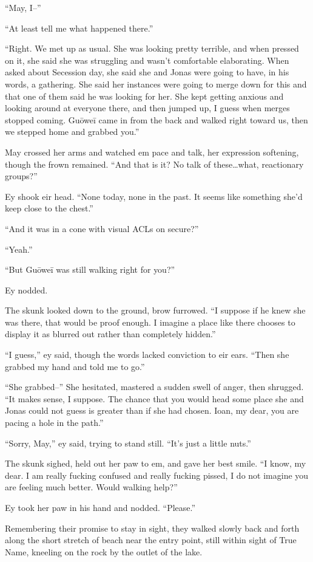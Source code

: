 ``May, I--''

``At least tell me what happened there.''

``Right. We met up as usual. She was looking pretty terrible, and when pressed on it, she said she was struggling and wasn't comfortable elaborating. When asked about Secession day, she said she and Jonas were going to have, in his words, a gathering. She said her instances were going to merge down for this and that one of them said he was looking for her. She kept getting anxious and looking around at everyone there, and then jumped up, I guess when merges stopped coming. Guōweī came in from the back and walked right toward us, then we stepped home and grabbed you.''

May crossed her arms and watched em pace and talk, her expression softening, though the frown remained. ``And that is it? No talk of these\ldots what, reactionary groups?''

Ey shook eir head. ``None today, none in the past. It seems like something she'd keep close to the chest.''

``And it was in a cone with visual ACLs on secure?''

``Yeah.''

``But Guōweī was still walking right for you?''

Ey nodded.

The skunk looked down to the ground, brow furrowed. ``I suppose if he knew she was there, that would be proof enough. I imagine a place like there chooses to display it as blurred out rather than completely hidden.''

``I guess,'' ey said, though the words lacked conviction to eir ears. ``Then she grabbed my hand and told me to go.''

``She grabbed--'' She hesitated, mastered a sudden swell of anger, then shrugged. ``It makes sense, I suppose. The chance that you would head some place she and Jonas could not guess is greater than if she had chosen. Ioan, my dear, you are pacing a hole in the path.''

``Sorry, May,'' ey said, trying to stand still. ``It's just a little nuts.''

The skunk sighed, held out her paw to em, and gave her best smile. ``I know, my dear. I am really fucking confused and really fucking pissed, I do not imagine you are feeling much better. Would walking help?''

Ey took her paw in his hand and nodded. ``Please.''

Remembering their promise to stay in sight, they walked slowly back and forth along the short stretch of beach near the entry point, still within sight of True Name, kneeling on the rock by the outlet of the lake.

